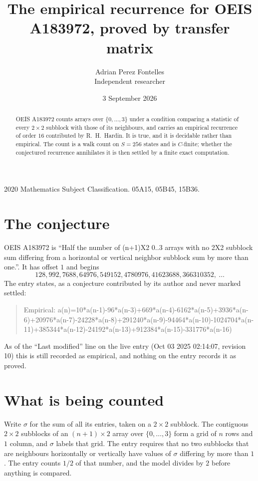 \documentclass[11pt,a4paper]{article}
\title{The empirical recurrence for OEIS A183972, proved by transfer matrix}
\author{Adrian Perez Fontelles\\ \small Independent researcher}
\date{3 September 2026}
\theoremstyle{plain}
\theoremstyle{definition}
\begin{document}
\maketitle

\begin{abstract}
OEIS A183972 counts arrays over $\{0,\dots,3\}$ under a condition comparing a statistic of
every $2\times2$ subblock with those of its neighbours, and carries an empirical recurrence
of order $16$ contributed by R.~H.~Hardin. It is true, and it is decidable rather than
empirical. The count is a walk count on $S=256$ states and is $C$-finite; whether the
conjectured recurrence annihilates it is then settled by a finite exact computation.
\end{abstract}

\noindent\small 2020 Mathematics Subject Classification. 05A15, 05B45, 15B36.\normalsize

\section{The conjecture}

OEIS A183972 is ``Half the number of (n+1)X2 0..3 arrays with no 2X2 subblock sum differing from a horizontal or vertical neighbor subblock sum by more than one.''. It has offset $1$ and begins
\[
128, 992, 7688, 64976, 549152, 4780976, 41623688, 366310352,\ \dots
\]
The entry states, as a conjecture contributed by its author and never marked settled:
\begin{quote}
Empirical: a(n)=10*a(n-1)-96*a(n-3)+669*a(n-4)-6162*a(n-5)+3936*a(n-6)+20976*a(n-7)-24228*a(n-8)+291240*a(n-9)-94464*a(n-10)-1024704*a(n-11)+385344*a(n-12)-24192*a(n-13)+912384*a(n-15)-331776*a(n-16)
\end{quote}
As of the ``Last modified'' line on the live entry (Oct 03 2025 02:14:07, revision 10) this is still
recorded as empirical, and nothing on the entry records it as proved.

\section{What is being counted}

Write $\sigma$ for the sum of all its entries, taken on a $2\times2$ subblock. The contiguous $2\times2$
subblocks of an $(n+1)\times2$ array over $\{0,\dots,3\}$ form a grid of $n$ rows
and $1$ column, and $\sigma$ labels that grid. The entry
requires that no two subblocks that are neighbours horizontally or vertically have values of $\sigma$ differing by more than $1$. The entry counts $1/2$ of that number, and the model divides by $2$ before anything is compared.
\end{document}
